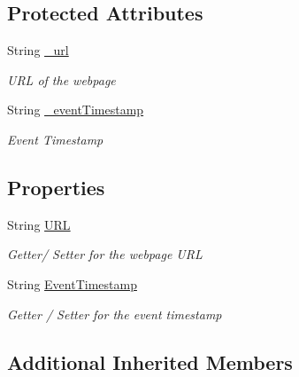 \subsection*{Protected Attributes}
\begin{DoxyCompactItemize}
\item 
String \hyperlink{class_web_analyzer_1_1_models_1_1_message_model_1_1_event_message_aef3ed320a568084cd131451ccc71fc8b}{\+\_\+url}
\begin{DoxyCompactList}\small\item\em U\+R\+L of the webpage \end{DoxyCompactList}\item 
String \hyperlink{class_web_analyzer_1_1_models_1_1_message_model_1_1_event_message_a48a2a6f84fb71c7083b757af773fc183}{\+\_\+event\+Timestamp}
\begin{DoxyCompactList}\small\item\em Event Timestamp \end{DoxyCompactList}\end{DoxyCompactItemize}
\subsection*{Properties}
\begin{DoxyCompactItemize}
\item 
String \hyperlink{class_web_analyzer_1_1_models_1_1_message_model_1_1_event_message_a29a86382ec9c22a11920131a9b1ab644}{U\+R\+L}
\begin{DoxyCompactList}\small\item\em Getter/ Setter for the webpage U\+R\+L \end{DoxyCompactList}\item 
String \hyperlink{class_web_analyzer_1_1_models_1_1_message_model_1_1_event_message_a5014b7357295d3607057ff71c949b913}{Event\+Timestamp}
\begin{DoxyCompactList}\small\item\em Getter / Setter for the event timestamp \end{DoxyCompactList}\end{DoxyCompactItemize}
\subsection*{Additional Inherited Members}


